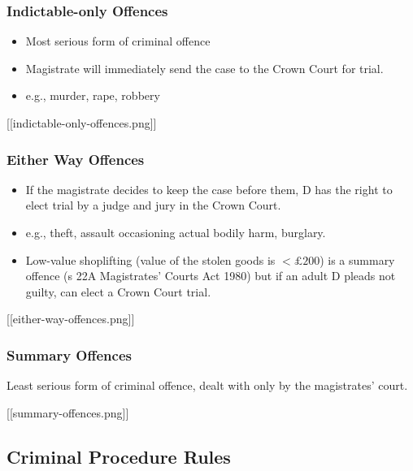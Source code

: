 \documentclass[
]{article}
\providecommand{\tightlist}{%
  \setlength{\itemsep}{0pt}\setlength{\parskip}{0pt}}
\begin{document}
\hypertarget{indictable-only-offences}{%
\subsubsection{Indictable-only
Offences}\label{indictable-only-offences}}

\begin{itemize}
\tightlist
\item
  Most serious form of criminal offence
\item
  Magistrate will immediately send the case to the Crown Court for
  trial.
\item
  e.g., murder, rape, robbery
\end{itemize}

{[}{[}indictable-only-offences.png{]}{]}

\hypertarget{either-way-offences}{%
\subsubsection{Either Way Offences}\label{either-way-offences}}

\begin{itemize}
\tightlist
\item
  If the magistrate decides to keep the case before them, D has the
  right to elect trial by a judge and jury in the Crown Court.
\item
  e.g., theft, assault occasioning actual bodily harm, burglary.
\item
  Low-value shoplifting (value of the stolen goods is \(<£200\)) is a
  summary offence (s 22A Magistrates' Courts Act 1980) but if an adult D
  pleads not guilty, can elect a Crown Court trial.
\end{itemize}

{[}{[}either-way-offences.png{]}{]}

\hypertarget{summary-offences}{%
\subsubsection{Summary Offences}\label{summary-offences}}

Least serious form of criminal offence, dealt with only by the
magistrates' court.

{[}{[}summary-offences.png{]}{]}

\hypertarget{criminal-procedure-rules}{%
\subsection{Criminal Procedure Rules}\label{criminal-procedure-rules}}
\end{document}
